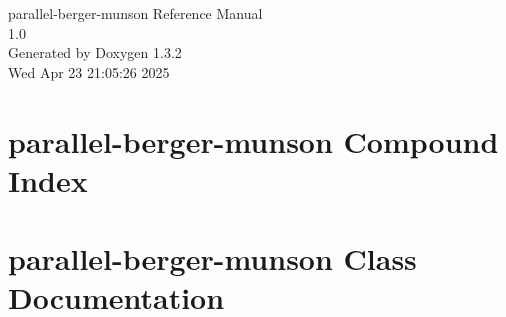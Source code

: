\documentclass[a4paper]{book}
\begin{document}
\begin{titlepage}
\vspace*{7cm}
\begin{center}
{\Large parallel-berger-munson Reference Manual\\[1ex]\large 1.0 }\\
\vspace*{1cm}
{\large Generated by Doxygen 1.3.2}\\
\vspace*{0.5cm}
{\small Wed Apr 23 21:05:26 2025}\\
\end{center}
\end{titlepage}
\clearemptydoublepage
{}
\tableofcontents
\clearemptydoublepage
{}
\chapter{parallel-berger-munson Compound Index}

\chapter{parallel-berger-munson Class Documentation}

\printindex
\end{document}
